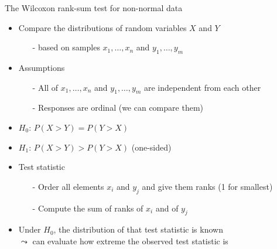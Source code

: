 \begin{frame}[c]{The Wilcoxon rank-sum test for non-normal data}

\begin{itemize}
\item Compare the distributions of random variables $X$ and $Y$ 
\begin{itemize}
\item[-] based on samples $x_1, \dots, x_n$ and $y_1, \dots, y_m$
\end{itemize}
\smallskip
\item Assumptions
\begin{itemize}
\item[-] All of $x_1, \dots, x_n$ and $y_1, \dots, y_m$ are independent
from each other 
\item[-] Responses are ordinal (we can compare them)
\end{itemize}  
\pause
\item $H_0$: $P(X > Y) = P(Y > X)$
\pause
\item $H_1$: $P(X > Y) > P(Y > X)$ (one-sided)
\medskip
\pause
\item Test statistic
\begin{itemize}
\item[-] Order all elements $x_i$ and $y_j$ and give them ranks
(1 for smallest)
\item[-] Compute the sum of ranks of $x_i$ and of $y_j$
\smallskip
\pause
\end{itemize}
\item Under $H_0$, the distribution of that test statistic is known\\
$\leadsto$ can evaluate how extreme the observed test statistic is
\end{itemize}

\end{frame}
